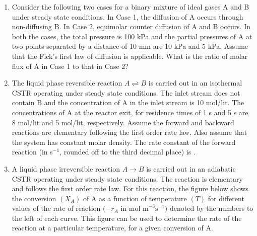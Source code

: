 \documentclass[journal,12pt,onecolumn]{IEEEtran}
\theoremstyle{remark}
\begin{document}
\begin{enumerate}
\item Consider the following two cases for a binary mixture of ideal gases A and B under steady state conditions. In Case 1, the diffusion of A occurs through non-diffusing B. In Case 2, equimolar counter diffusion of A and B occurs. In both the cases, the total pressure is 100 kPa and the partial pressures of A at two points separated by a distance of 10 mm are 10 kPa and 5 kPa. Assume that the Fick's first law of diffusion is applicable. What is the ratio of molar flux of A in Case 1 to that in Case 2?
\hfill{}
\begin{enumerate}
\end{enumerate}

\item The liquid phase reversible reaction $A \rightleftharpoons B$ is carried out in an isothermal CSTR operating under steady state conditions. The inlet stream does not contain B and the concentration of A in the inlet stream is 10 mol/lit. The concentrations of A at the reactor exit, for residence times of 1 s and 5 s are 8 mol/lit and 5 mol/lit, respectively. Assume the forward and backward reactions are elementary following the first order rate law. Also assume that the system has constant molar density. The rate constant of the forward reaction (in s$^{-1}$, rounded off to the third decimal place) is \underline{\hspace{1cm}}.\hfill{}

\item A liquid phase irreversible reaction $A \rightarrow B$ is carried out in an adiabatic CSTR operating under steady state conditions. The reaction is elementary and follows the first order rate law. For this reaction, the figure below shows the conversion $(X_{A})$ of A as a function of temperature $(T)$ for different values of the rate of reaction $(-r_{A}$ in $\text{mol m}^{-3}\text{s}^{-1} )$ denoted by the numbers to the left of each curve. This figure can be used to determine the rate of the reaction at a particular temperature, for a given conversion of A.


\end{enumerate}
\end{document}
